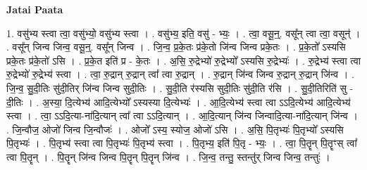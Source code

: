 \documentclass[17pt]{extarticle}
\begin{document}
\textbf{Jatai Paata} \newline

1. वसु॑भ्य स्त्वा त्वा॒ वसु॑भ्यो॒ वसु॑भ्य स्त्वा । . वसु॑भ्य॒ इति॒ वसु॑ - भ्यः॒ । . त्वा॒ वसू॒न्॒. वसू᳚न् त्वा त्वा॒ वसून्॑ । . वसू᳚न् जिन्व जिन्व॒ वसू॒न्॒. वसू᳚न् जिन्व । . जि॒न्व॒ प्र॒के॒तः प्र॑के॒तो जि॑न्व जिन्व प्रके॒तः । . प्र॒के॒तो᳚ ऽस्यसि प्रके॒तः प्र॑के॒तो॑ ऽसि । . प्र॒के॒त इति॑ प्र - के॒तः । . अ॒सि॒ रु॒द्रेभ्यो॑ रु॒द्रेभ्यो᳚ ऽस्यसि रु॒द्रेभ्यः॑ । . रु॒द्रेभ्य॑ स्त्वा त्वा रु॒द्रेभ्यो॑ रु॒द्रेभ्य॑ स्त्वा । . त्वा॒ रु॒द्रान् रु॒द्रान् त्वा᳚ त्वा रु॒द्रान् । . रु॒द्रान् जि॑न्व जिन्व रु॒द्रान् रु॒द्रान् जि॑न्व । . जि॒न्व॒ सु॒दी॒तिः सु॑दी॒तिर् जि॑न्व जिन्व सुदी॒तिः । . सु॒दी॒ति र॑स्यसि सुदी॒तिः सु॑दी॒ति र॑सि । . सु॒दी॒तिरिति॑ सु - दी॒तिः । . अ॒स्या॒ दि॒त्येभ्य॑ आदि॒त्येभ्यो᳚ ऽस्यस्या दि॒त्येभ्यः॑ । . आ॒दि॒त्येभ्य॑ स्त्वा त्वा ऽऽदि॒त्येभ्य॑ आदि॒त्येभ्य॑ स्त्वा । . त्वा॒ ऽऽदि॒त्या-ना॑दि॒त्यान् त्वा᳚ त्वा ऽऽदि॒त्यान् । . आ॒दि॒त्यान् जि॑न्व जिन्वादि॒त्या-ना॑दि॒त्यान् जि॑न्व । . जि॒न्वौज॒ ओजो॑ जिन्व जि॒न्वौजः॑ । . ओजो᳚ ऽस्य॒ स्योज॒ ओजो॑ ऽसि । . अ॒सि॒ पि॒तृभ्यः॑ पि॒तृभ्यो᳚ ऽस्यसि पि॒तृभ्यः॑ । . पि॒तृभ्य॑ स्त्वा त्वा पि॒तृभ्यः॑ पि॒तृभ्य॑ स्त्वा । . पि॒तृभ्य॒ इति॑ पि॒तृ - भ्यः॒ । . त्वा॒ पि॒तॄन् पि॒तॄꣳस् त्वा᳚ त्वा पि॒तॄन् । . पि॒तॄन् जि॑न्व जिन्व पि॒तॄन् पि॒तॄन् जि॑न्व । . जि॒न्व॒ तन्तु॒ स्तन्तु॑र् जिन्व जिन्व॒ तन्तुः॑ । \newline
\end{document}
